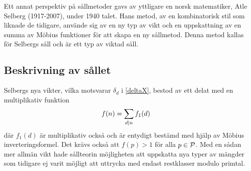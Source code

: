 Ett annat perspektiv på sållmetoder gavs av yttligare en norsk matematiker, Atle Selberg (1917-2007), under 1940 talet. 
Hans metod, av en kombinatorisk stil som liknade de tidigare, använde sig av en ny typ av vikt och en uppskattning av en summa av Möbius funktioner för att skapa en ny sållmetod. Denna metod kallas för Selbergs såll och är ett typ av viktad såll.

\subsection{Beskrivning av sållet}
Selbergs nya vikter, vilka motsvarar \(\delta_d\) i \eqref{deltaX}, bestod av ett delat med en multiplikativ funktion 
\begin{equation}
    f(n) = \sum_{d\divides n}f_1(d)\nonumber
\end{equation}
där \(f_1(d)\) är  multiplikativ också och är entydigt bestämd med hjälp av Möbius inverteringsformel. Det krävs också att \(f(p) > 1\) för alla \(p\in\P\). 
Med en sådan mer allmän vikt hade sållteorin möjligheten att uppskatta nya typer av mängder som tidigare ej varit möjligt att uttrycka med endast restklasser modulo primtal. 

